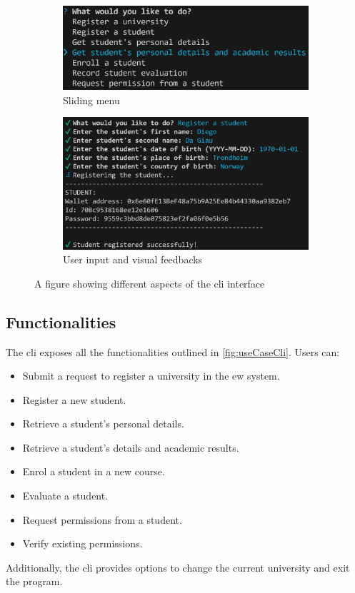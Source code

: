 \begin{figure}
    \centering
    \begin{subfigure}{.45\textwidth}
        \centering
        \includegraphics[width=\textwidth]{figures/CLI screen 1.png}
        \caption{Sliding menu}
        \label{sfig:cliDesign1}
    \end{subfigure}
    \hfill
    \begin{subfigure}{.50\textwidth}
        \centering
        \includegraphics[width=\textwidth]{figures/CLI screen 2.png}
        \caption{User input and visual feedbacks}
        \label{sfig:cliDesign2}
    \end{subfigure}
    \caption{A figure showing different aspects of the \acrshort{cli} interface}
    \label{fig:clifigs}
\end{figure}

\subsection{Functionalities}
The \acrshort{cli} exposes all the functionalities outlined in \cref{fig:useCaseCli}. Users can:
\begin{itemize}
    \item Submit a request to register a university in the \acrshort{ew} system.
    \item Register a new student.
    \item Retrieve a student’s personal details.
    \item Retrieve a student’s details and academic results.
    \item Enrol a student in a new course.
    \item Evaluate a student.
    \item Request permissions from a student.
    \item Verify existing permissions.
\end{itemize}
Additionally, the \acrshort{cli} provides options to change the current university and exit the program.

